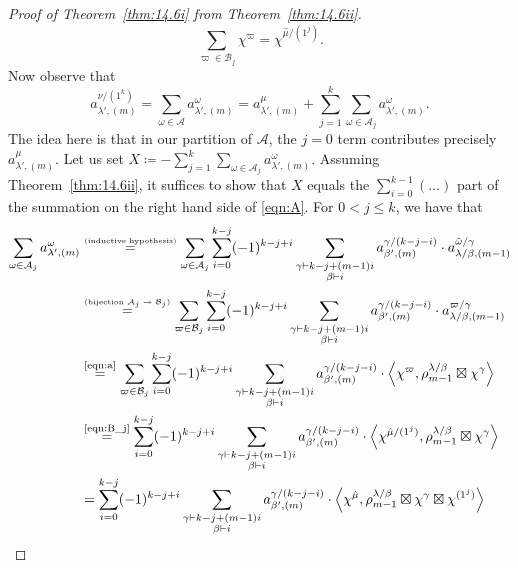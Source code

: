 \documentclass[ALCO, Unicode]{cedram}
\begin{document}
\begin{proof}[Proof of Theorem~\ref{thm:14.6i} from Theorem~\ref{thm:14.6ii}]
	\begin{equation}\label{eqn:B_j}
		\sum_{\varpi\in\mathcal{B}_j}\chi^\varpi = \chi^{\hat{\mu}/(1^j)}.
	\end{equation}
	Now observe that
	\[ a^{\nu/(1^k)}_{\lambda',(m)} = \sum_{\omega\in\mathcal{A}} a^{\omega}_{\lambda',(m)} = a^{\mu}_{\lambda',(m)} + \sum_{j=1}^k \sum_{\omega\in\mathcal{A}_j} a^{\omega}_{\lambda',(m)}. \]
	The idea here is that in our partition of $\mathcal{A}$, the $j=0$ term contributes precisely $a^{\mu}_{\lambda',(m)}$. Let us set $X \coloneqq  -\sum_{j=1}^k \sum_{\omega\in\mathcal{A}_j} a^{\omega}_{\lambda',(m)}$. Assuming Theorem~\ref{thm:14.6ii}, it suffices to show that $X$ equals the $\sum_{i=0}^{k-1}(\dotsc)$ part of the summation on the right hand side of \eqref{eqn:A}. For $0<j\leq k$, we have that
	\begin{align*}
		\sum_{\omega\in\mathcal{A}_j} a^{\omega}_{\lambda',(m)} &\overset{\text{\normalfont\tiny(inductive hypothesis)}}{=} \sum_{\omega\in\mathcal{A}_j} \sum_{i=0}^{k-j}(-1)^{k-j+i}\sum_{\substack{\gamma\vdash k-j + (m-1)i\\ \beta\vdash i}}a^{\gamma/(k-j-i)}_{\beta',(m)}\cdot a^{\hat{\omega}/\gamma}_{\lambda/\beta,(m-1)}\\
		&\overset{\text{\normalfont\tiny(bijection $\mathcal{A}_j\to\mathcal{B}_j$)}}{=}\sum_{\varpi\in\mathcal{B}_j} \sum_{i=0}^{k-j}(-1)^{k-j+i}\sum_{\substack{\gamma\vdash k-j + (m-1)i\\ \beta\vdash i}}a^{\gamma/(k-j-i)}_{\beta',(m)}\cdot a^{\varpi/\gamma}_{\lambda/\beta,(m-1)}
		\\
		&\overset{\normalfont\tiny \text{\eqref{eqn:a}}}{=}\sum_{\varpi\in\mathcal{B}_j} \sum_{i=0}^{k-j}(-1)^{k-j+i}\sum_{\substack{\gamma\vdash k-j + (m-1)i\\ \beta\vdash i}}a^{\gamma/(k-j-i)}_{\beta',(m)}\cdot \left\langle\chi^{\varpi},\rho^{\lambda/\beta}_{m-1}\boxtimes\chi^\gamma\right\rangle \\
		&\overset{\normalfont\tiny\text{\eqref{eqn:B_j}}}{=}\sum_{i=0}^{k-j}(-1)^{k-j+i}\sum_{\substack{\gamma\vdash k-j + (m-1)i\\ \beta\vdash i}}a^{\gamma/(k-j-i)}_{\beta',(m)}\cdot \left\langle\chi^{\hat{\mu}/(1^j)},\rho^{\lambda/\beta}_{m-1}\boxtimes\chi^\gamma\right\rangle
		\\
		&=\sum_{i=0}^{k-j}(-1)^{k-j+i}\sum_{\substack{\gamma\vdash k-j + (m-1)i\\ \beta\vdash i}} a^{\gamma/(k-j-i)}_{\beta',(m)}\cdot \left\langle\chi^{\hat{\mu}},\rho^{\lambda/\beta}_{m-1}\boxtimes\chi^\gamma\boxtimes\chi^{(1^j)}\right\rangle\\

\end{align*}
\end{proof}
\end{document}
